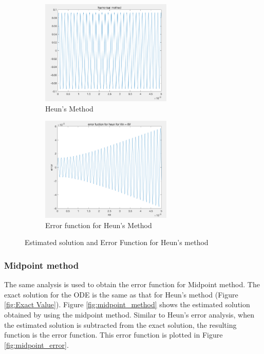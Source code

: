 \documentclass[11pt,a4paper]{article}
\begin{document}
\begin{figure}[h]
\begin{subfigure}{.5\textwidth}
  \includegraphics[width=.9\linewidth,height = 5cm
  ]{Ex2_Figs/heun_error_numerical_method}
  \caption[right]{Heun's Method}
  \label{fig:Heun Method}
\end{subfigure}
\begin{subfigure}{.5\textwidth}
  \includegraphics[width=.9\linewidth,height = 5cm]{Ex2_Figs/heun_error}
  \caption{Error function for Heun's Method}
  \label{fig:heun_error}
\end{subfigure}
\caption{Estimated solution and Error Function for Heun's method}
\label{fig:Heun_Error_sub}
\end{figure}





\clearpage

\subsubsection{Midpoint method}
The same analysis is used to obtain the error function for Midpoint method. The exact solution for the ODE is the same as that for Heun's method (Figure \ref{fig:Exact Value}).  Figure \ref{fig:midpoint_method} shows the estimated solution obtained by using the midpoint method. Similar to Heun's error analysis, when the estimated solution is subtracted from the exact solution, the resulting function is the error function. This error function is plotted in Figure \ref{fig:midpoint_error}.
\end{document}
